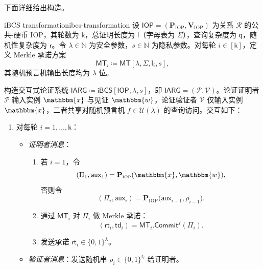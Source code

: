 \documentclass[american,singlepageview]{snargs-book-zh}
\newcommand{\Bits}{\{0,1\}}
\newcommand{\DefineEqual}{\coloneqq}
\newcommand{\AuxiliaryState}{\mathsf{aux}}
\newcommand{\Naturals}{\mathbb{N}}
\newcommand{\Relation}{\mathcal{R}}
\newcommand{\Instance}{\mathbbm{x}}
\newcommand{\Witness}{\mathbbm{w}}
\newcommand{\ProtoProver}{P}
\newcommand{\ProtoVerifier}{V}
\newcommand{\ProtoAlphabet}{\Sigma}
\newcommand{\ProtoRoundComplexity}{\mathsf{k}}
\newcommand{\ProtoProofLength}{\mathsf{l}}
\newcommand{\ProtoQueryComplexity}{\mathsf{q}}
\newcommand{\ProtoRandomnessComplexity}{\mathsf{r}}
\newcommand{\RoundIndex}{i}
\newcommand{\IOPSymbol}{\mathsf{IOP}}
\newcommand{\IOPSubscript}{\scriptscriptstyle\mathrm{IOP}}
\newcommand{\IOPFormat}[1]{\mathbf{#1}}
\newcommand{\IOPProver}{\IOPFormat{\ProtoProver}_{\IOPSubscript}}
\newcommand{\IOPVerifier}{\IOPFormat{\ProtoVerifier}_{\IOPSubscript}}
\newcommand{\IOPSystem}{(\IOPProver,\IOPVerifier)}
\newcommand{\IOPString}{\Pi}
\newcommand{\IOPVerifierRandomMessage}{\rho}
\newcommand{\IOPRoundComplexity}{\ProtoRoundComplexity}
\newcommand{\IOPAlphabet}{\ProtoAlphabet}
\newcommand{\IOPProofLength}{\ProtoProofLength}
\newcommand{\IOPRandomnessComplexity}{\ProtoRandomnessComplexity}
\newcommand{\IOPQueryComplexity}{\ProtoQueryComplexity}
\newcommand{\IOPAuxiliaryState}{\AuxiliaryState}
\newcommand{\ARGFormat}[1]{\mathcal{#1}}
\newcommand{\ARGProver}{\ARGFormat{\ProtoProver}}
\newcommand{\ARGVerifier}{\ARGFormat{\ProtoVerifier}}
\newcommand{\ARGSystem}{(\ARGProver,\ARGVerifier)}
\newcommand{\IARGSymbol}{\mathsf{IARG}}
\newcommand{\ROFunction}{f}
\newcommand{\RODistribution}[1]{\mathcal{U}(#1)}
\newcommand{\SecurityParameter}{\lambda}
\newcommand{\PrivacyParameter}{s}
\newcommand{\MTSymbol}{\mathsf{MT}}
\newcommand{\MTConstructor}[4]{\MTSymbol[#1,#2,#3,#4]}
\newcommand{\MTCommitment}{\mathsf{rt}}
\newcommand{\MTTrapdoor}{\mathsf{td}}
\newcommand{\MTIdxCommit}[1]{\MTSymbol_{#1}.\mathsf{Commit}}
\newcommand{\FormatTransName}[1]{\bm{\mathsf{#1}}}
\newcommand{\IBCSSymbol}{\FormatTransName{iBCS}}
\newcommand{\FormatTransInputs}[3]{[#1,#2,#3]}
\newcommand{\IBCSTransformation}[3]{\IBCSSymbol\FormatTransInputs{#1}{#2}{#3}}
\newcommand{\IBCSText}{iBCS transformation\xspace}
\begin{document}
下面详细给出构造。

\begin{ImportantConstruction}{\IBCSText}{ibcs-transformation}
设 $\IOPSymbol=\IOPSystem$ 为关系 $\Relation$ 的公共-硬币 IOP，其轮数为 $\IOPRoundComplexity$，总证明长度为 $\IOPProofLength$（字母表为 $\IOPAlphabet$），查询复杂度为 $\IOPQueryComplexity$，随机性复杂度为 $\IOPRandomnessComplexity$。令 $\SecurityParameter\in\Naturals$ 为安全参数，$\PrivacyParameter\in\Naturals$ 为隐私参数。对每轮 $\RoundIndex\in[\IOPRoundComplexity]$，定义 Merkle 承诺方案
\[
  \MTSymbol_{\RoundIndex}\DefineEqual
  \MTConstructor{\SecurityParameter}{\IOPAlphabet}{\IOPProofLength_{\RoundIndex}}{\PrivacyParameter},
\]
其随机预言机输出长度均为 $\SecurityParameter$ 位。

构造交互式论证系统 $\IARGSymbol\DefineEqual\IBCSTransformation{\IOPSymbol}{\SecurityParameter}{\PrivacyParameter}$，即
\(\IARGSymbol=\ARGSystem\)。论证证明者 $\ARGProver$ 输入实例 $\Instance$ 与见证 $\Witness$，论证验证者 $\ARGVerifier$ 仅输入实例 $\Instance$，二者共享对随机预言机
\(\ROFunction\in\RODistribution{\SecurityParameter}\) 的查询访问。交互如下：
\begin{enumerate}

\item 对每轮 $\RoundIndex=1,\dots,\IOPRoundComplexity$：
  \begin{itemize}
    \item \emph{证明者消息}：
      \begin{enumerate}[nolistsep]
        \item 若 $\RoundIndex=1$，令
        \[
          (\IOPString_{1},\IOPAuxiliaryState_{1})
            =\IOPProver(\Instance,\Witness),
        \]
        否则令
        \[
          (\IOPString_{\RoundIndex},\IOPAuxiliaryState_{\RoundIndex})
            =\IOPProver\bigl(\IOPAuxiliaryState_{\RoundIndex-1},\IOPVerifierRandomMessage_{\RoundIndex-1}\bigr).
        \]
        \item 通过 $\MTSymbol_{\RoundIndex}$ 对 $\IOPString_{\RoundIndex}$ 做 Merkle 承诺：
        \[
          (\MTCommitment_{\RoundIndex},\MTTrapdoor_{\RoundIndex})
            =\MTIdxCommit{\RoundIndex}^{\ROFunction}(\IOPString_{\RoundIndex}).
        \]
        \item 发送承诺 $\MTCommitment_{\RoundIndex}\in\Bits^{\SecurityParameter}$。
      \end{enumerate}
    \item \emph{验证者消息}：发送随机串
      \(\IOPVerifierRandomMessage_{\RoundIndex}\in\Bits^{\IOPRandomnessComplexity_{\RoundIndex}}\)
      给证明者。
  \end{itemize}


\end{enumerate}
\end{ImportantConstruction}
\end{document}
